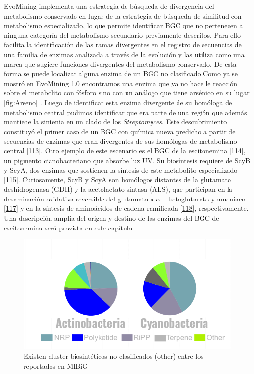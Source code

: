\documentclass[12pt,twoside]{reedthesis}
\begin{document}
  EvoMining implementa una estrategia de búsqueda de divergencia del
  metabolismo conservado en lugar de la estrategia de búsqueda de
  similitud con metabolismo especializado, lo que permite identificar BGC
  que no pertenecen a ninguna categoría del metabolismo secundario
  previamente descritos. Para ello facilita la identificación de las ramas
  divergentes en el registro de secuencias de una familia de enzimas
  analizada a través de la evolución y las utiliza como una marca que
  sugiere funciones divergentes del metabolismo conservado. De esta forma
  se puede localizar alguna enzima de un BGC no clasificado Como ya se
  mostró en EvoMining 1.0 encontramos una enzima que ya no hace le
  reacción sobre el metabolito con fósforo sino con un análogo que tiene
  arsénico en su lugar \autoref{fig:Arseno} . Luego de identificar esta
  enzima divergente de su homóloga de metabolismo central pudimos
  identificar que era parte de una región que además mantiene la sintenia
  en un clado de los \emph{Streptomyces}. Este descubrimiento constituyó
  el primer caso de un BGC con química nueva predicho a partir de
  secuencias de enzimas que eran divergentes de sus homólogas de
  metabolismo central {[}\protect\hyperlink{ref-cruz_tesis_2013}{113}{]}.
  Otro ejemplo de este escenario es el BGC de la escitonemina
  {[}\protect\hyperlink{ref-garciapichel_evidence_1992}{114}{]}, un
  pigmento cianobacteriano que absorbe luz UV. Su biosíntesis requiere de
  ScyB y ScyA, dos enzimas que sostienen la síntesis de este metabolito
  especializado
  {[}\protect\hyperlink{ref-balskus_investigating_2008}{115}{]}.
  Curiosamente, ScyB y ScyA son homólogos distantes de la glutamato
  deshidrogenasa (GDH) y la acetolactato sintasa (ALS), que participan en
  la desaminación oxidativa reversible del glutamato a
  \(\alpha-\)ketoglutarato y amoníaco
  {[}\protect\hyperlink{ref-engel_glutamate_2014}{117}{]} y en la síntesis
  de aminoácidos de cadena ramificada
  {[}\protect\hyperlink{ref-liu_acetohydroxyacid_2016}{118}{]},
  respectivamente. Una descripción amplia del origen y destino de las
  enzimas del BGC de escitonemina será provista en este capítulo.
  
  \begin{figure}[h!tbp]
  \centering
  \includegraphics[angle = 0,scale = .7]{chapter2/other.png}
  \caption[Existen cluster biosintéticos no clasificados (other) entre los reportados en MIBiG]{\footnotesize{Existen cluster biosintéticos no clasificados (other) entre los reportados en MIBiG}}
  \label{fig:other}
  \end{figure}
  
\end{document}
